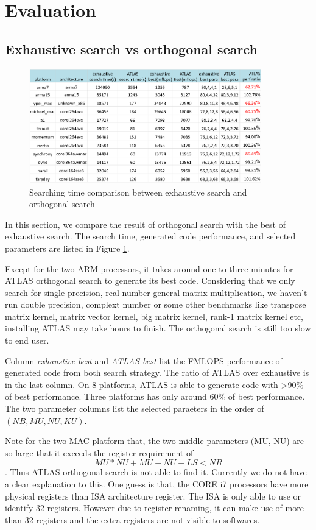 \section{Evaluation}
\label{sec:evaluation}

  \subsection{Exhaustive search vs \atl orthogonal search}
  \label{sec:exhaustiveVSorthogonal}
  \begin{figure}[tbhp]
    \centering
    \includegraphics[width=0.9\textwidth]{images/exhaustiveVsorthogonal.png}
    \caption{Searching time comparison between exhaustive search and \atl orthogonal search}
    \label{fig:exhaustiveVsorthogonal}
  \end{figure}
  In this section, we compare the result of \atl orthogonal search with the best of exhaustive
  search. The search time, generated code performance, and selected parameters are listed in Figure
  \ref{fig:exhaustiveVsorthogonal}.\par
  Except for the two ARM processors, it takes around one to three minutes for ATLAS orthogonal search
  to generate its best code. Considering that we only search for single precision, real number general
  matrix multiplication, we haven't run double precision, complext number or some other benchmarks
  like transpose matrix kernel, matrix vector kernel, big matrix kernel, rank-1 matrix kernel etc, installing
  ATLAS may take hours to finish. The orthogonal search is still too slow to end user.\par
  Column \textit{exhaustive best} and \textit{ATLAS best} list the FMLOPS performance of generated code from
  both search strategy. The ratio of ATLAS over exhaustive is in the last column. On 8 platforms,
  ATLAS is able to generate code with >90\% of best performance. Three platforms has only around 60\% of
  best performance. The two parameter columns list the selected paraeters in the order of $(NB, MU, NU, KU)$.\par
  Note for the two MAC platform that, the two middle parameters (MU, NU) are so large that it exceeds
  the register requirement of \[ MU*NU + MU + NU + LS < NR \]. Thus ATLAS orthogonal search is not able
  to find it. Currently we do not have a clear explanation to this. One guess is that, the CORE i7 processors
  have more physical registers than ISA architecture register. The ISA is only able to use or identify 32 registers.
  However due to register renaming, it can make use of more than 32 registers and the extra registers are not visible
  to softwares.\par


